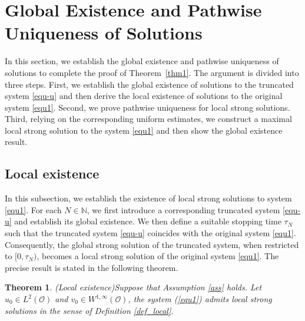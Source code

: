 \documentclass[reqno, 11pt]{amsart}
\newtheorem{thm}{Theorem}
\theoremstyle{definition}
\numberwithin{equation}{section} \numberwithin{lem}{section}
\numberwithin{thm}{section} \numberwithin{prop}{section}
\numberwithin{cor}{section} \numberwithin{rem}{section}
\numberwithin{defn}{section}
\begin{document}
\section{ Global Existence and Pathwise Uniqueness of Solutions}
In this section, we establish   the global existence and pathwise uniqueness of solutions to complete the proof of Theorem~\ref{thm1}. The argument is divided into three steps.  First, we establish the global existence of solutions to the
truncated system \eqref{equ-u} and then derive the local existence of solutions to the
original system \eqref{equ1}.  Second, we prove  pathwise uniqueness for local strong  solutions. Third, relying on the corresponding uniform estimates, we construct a maximal local strong solution to the
 system \eqref{equ1} and then show the global existence result.

\subsection{Local existence} In this subsection, we establish the existence of local strong solutions to system \eqref{equ1}.  For each $N\in\mathbb N$, we first introduce a corresponding truncated system \eqref{equ-u} and
establish its global existence. We then define a suitable stopping time \(\tau_N\) such that the truncated system \eqref{equ-u} coincides with the original system \eqref{equ1}. Consequently, the global strong solution  of the truncated system, when restricted to \([0,\tau_N)\), becomes a local strong solution of the original system \eqref{equ1}. The precise result is stated in the following theorem.
\begin{thm}(Local existence)\label{thm_Local} 
    Suppose that  Assumption \ref{ass} holds. Let $u_0\in L^2(\mathcal {O})$ and  $v_0\in W^{1,\infty}(\mathcal {O}) $, 	 the system (\ref{equ1}) admits  local strong  solutions    in the  sense of Definition \eqref{def_local}.
\end{thm}
\end{document}

